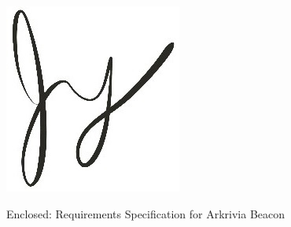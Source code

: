 \documentclass[11pt]{letter}
\begin{document}
\begin{letter}
\vspace*{-0.25cm}
\includegraphics[scale=0.8]{./images/signature.jpg}

{Enclosed: Requirements Specification for Arkrivia Beacon}

\end{letter}
\end{document}
